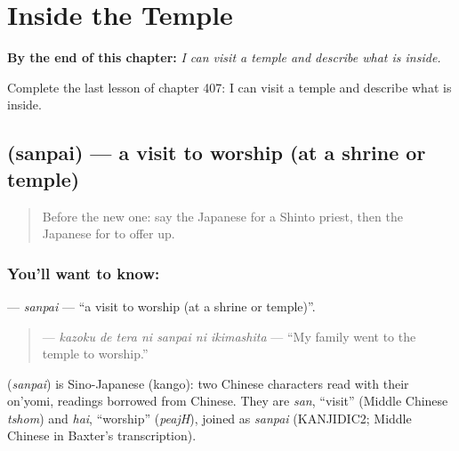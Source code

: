 
\chapter{Inside the Temple}
\label{ch:ja-inside-the-temple}

\begin{chapteropening}
\textbf{By the end of this chapter:} \emph{I can visit a temple and describe what is inside.}

Complete the last lesson of chapter 407: I can visit a temple and describe what is inside.
\end{chapteropening}

\section[\texorpdfstring{\ja{さんぱい} (sanpai)}{さんぱい (sanpai)}]{ (sanpai) — a visit to worship (at a shrine or temple)}

\label{lesson:JA-C407-sanpai}



\begin{quote}
Before the new one: say the Japanese for a Shinto priest, then the Japanese for to offer up.
\end{quote}

\subsection*{You'll want to know: }
\textbf{} — \emph{sanpai} — \textquotedblleft{}a visit to worship (at a shrine or temple)\textquotedblright{}.

\begin{quote}
\textbf{   } — \emph{kazoku de tera ni sanpai ni ikimashita} — \textquotedblleft{}My family went to the temple to worship.\textquotedblright{}
\end{quote}

\begin{cousinweb}
\textbf{} (\emph{sanpai}) is Sino-Japanese (kango): two Chinese characters read with their on'yomi, readings borrowed from Chinese. They are \emph{san}, \textquotedblleft{}visit\textquotedblright{} (Middle Chinese \emph{tshom}) and \emph{hai}, \textquotedblleft{}worship\textquotedblright{} (\emph{peajH}), joined as \emph{sanpai} (KANJIDIC2; Middle Chinese in Baxter's transcription).
\end{cousinweb}

